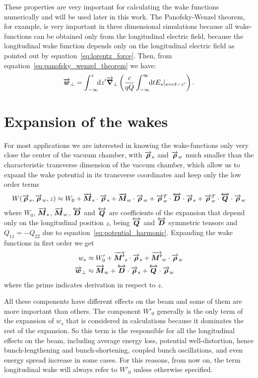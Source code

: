 \documentclass[
	12pt,				%
	openright,			%
	oneside,			%
	a4paper,		%
	chapter=TITLE,		%
	section=TITLE,		%
    brazil,				%
	english,			%
	sumario=tradicional,
	]{abntex2}
\begin{document}
  These properties are very important for calculating the wake functions numerically and will be used later in this work. The Panofsky-Wenzel theorem, for example, is very important in three dimensional simulations because all wake-functions can be obtained only from the longitudinal electric field, because the longitudinal wake function depends only on the longitudinal electric field as pointed out by equation~\eqref{eq:lorentz_force}. Then, from equation~\eqref{eq:panofsky_wenzel_theorem} we have:
  \begin{align}
  	  \vect{w}_\perp = \defint{z'}{\vect{\nabla}_\perp\left(\frac{c}{qQ}\infint{t}{E_s|_{s=ct-z'}}\right)}{-\infty}{z}.
  \end{align}

  \section{Expansion of the wakes}

  For most applications we are interested in knowing the wake-functions only very close the center of the vacuum chamber, with $\vect{\rho}_s$ and $\vect{\rho}_w$ much smaller than the characteristic transverse dimension of the vaccum chamber, which allow us to expand the wake potential in its transverse coordinates and keep only the low order terms
  \begin{align}\label{eq:wake_potential_expansion}
      W(\vect{\rho}_s, \vect{\rho}_w, z) \approx W_0 +
	  \vect{M}_s\cdot\vect{\rho}_s + \vect{M}_w\cdot\vect{\rho}_w +
	  \vect{\rho}_w^T\cdot\tensor{D}\cdot\vect{\rho}_s +
	  \vect{\rho}_w^T\cdot\tensor{Q}\cdot\vect{\rho}_w
  \end{align}
  where $W_0$, $\vect{M}_s$, $\vect{M}_w$, $\tensor{D}$ and $\tensor{Q}$ are coefficients of the expansion that depend only on the longitudinal position $z$, being $\tensor{Q}$ and $\tensor{D}$ symmetric tensors and $Q_{11}=-Q_{22}$ due to equation~\eqref{eq:potential_harmonic}. Expanding the wake functions in first order we get
  \begin{align}\label{eq:wake_functions_expansion}
      w_s &\approx W'_0 + \vect{M'}_s\cdot\vect{\rho}_s + \vect{M'}_w\cdot\vect{\rho}_w \\
	  \vect{w}_\perp &\approx \vect{M}_w + \tensor{D}\cdot\vect{\rho}_s + \tensor{Q}\cdot\vect{\rho}_w
  \end{align}
  where the prime indicates derivation in respect to $z$.

  All these components have different effects on the beam and some of them are more important than others. The component $W'_0$ generally is the only term of the expansion of $w_s$ that is considered in calculations because it dominates the rest of the expansion. So this term is the responsible for all the longitudinal effects on the beam, including average energy loss, potential well-distortion, hence bunch-lengthening and bunch-shortening, coupled bunch oscillations, and even energy spread increase in some cases. For this reasons, from now on, the term longitudinal wake will always refer to $W'_0$ unless otherwise specified.
\end{document}
